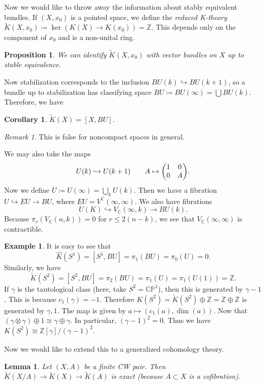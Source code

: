 \documentclass[leqno, openany]{memoir}
\newtheorem{cor}[thm]{Corollary}
\newtheorem{prop}[thm]{Proposition}
\newtheorem{lem}[thm]{Lemma}
\theoremstyle{definition}
\newtheorem{exm}[thm]{Example}
\theoremstyle{remark}
\newtheorem{rmk}[thm]{Remark}
\theoremstyle{plain}
\theoremstyle{definition}
\theoremstyle{remark}
\newcommand{\C}{\mathbb{C}}
\newcommand{\Z}{\mathbb{Z}}
\renewcommand{\P}{\mathbb{P}}
\newcommand{\wt}[1]{\widetilde{#1}}
\newcommand{\wh}[1]{\widehat{#1}}
\begin{document}
Now we would like to throw away the information about stably equivalent bundles. If $(X, x_0)$ is a pointed space, we define the \textit{reduced K-theory} $\wt{K}(X, x_0) \coloneqq \ker (K(X) \to K(x_0)) = \Z$. This depends only on the component of $x_0$ and is a non-unital ring. 

\begin{prop}
    We can identify $\wt{K}(X, x_0)$ with vector bundles on $X$ up to stable equivalence.
\end{prop}

Now stabilization corresponds to the inclusion $BU(k) \hookrightarrow BU(k+1)$, so a bundle up to stabilization has classifying space $BU \coloneqq BU(\infty) = \bigcup BU(k)$. Therefore, we have

\begin{cor}
    $\wt{K}(X) = [X, BU]$.
\end{cor}

\begin{rmk}
    This is false for noncompact spaces in general.
\end{rmk}

We may also take the maps 
\[ U(k) \hookrightarrow U(k+1) \qquad A \mapsto \mqty(1 & 0 \\ 0 & A). \]
Now we define $U \coloneqq U(\infty) = \bigcup_k U(k)$. Then we have a fibration $U \hookrightarrow EU \to BU$, where $EU = V^{\C}(\infty, \infty)$. We also have fibrations
\[ U(K) \hookrightarrow V_{\C}(\infty, k) \to BU(k). \]
Because $\pi_r(V_{\C}(n, k)) = 0$ for $r \leq 2(n-k)$, we see that $V_{\C}(\infty, \infty)$ is contractible.

\begin{exm}
    It is easy to see that 
    \[ \wh{K}(S^1) = [S^1, BU] = \pi_1(BU) = \pi_0(U) = 0. \] 
    Similarly, we have 
    \[ \wt{K}(S^2) = [S^2, BU] = \pi_2(BU) = \pi_1(U) = \pi_1(U(1)) = \Z. \]
    If $\gamma$ is the tautological class (here, take $S^2 = \C\P^1$), then this is generated by $\gamma - 1$. This is because $c_1(\gamma) = -1$. Therefore $K(S^2) = \wt{K}(S^2) \oplus \Z = \Z \oplus \Z$ is generated by $\gamma, 1$. The map is given by $a \mapsto (c_1(a), \dim(a))$. Now that $(\gamma \otimes \gamma) \oplus 1 \cong \gamma \oplus \gamma$. In particular, ${(\gamma-1)}^2 = 0$. Thus we have $K(S^2) \cong \Z[\gamma]/{ (\gamma-1) }^2$.
\end{exm}

Now we would like to extend this to a generalized cohomology theory.

\begin{lem}
    Let $(X, A)$ be a finite CW pair. Then $\wt{K}(X/A) \to \wt{K}(X) \to \wt{K}(A)$ is exact (because $A \subset X$ is a cofibration).
\end{lem}
\end{document}
